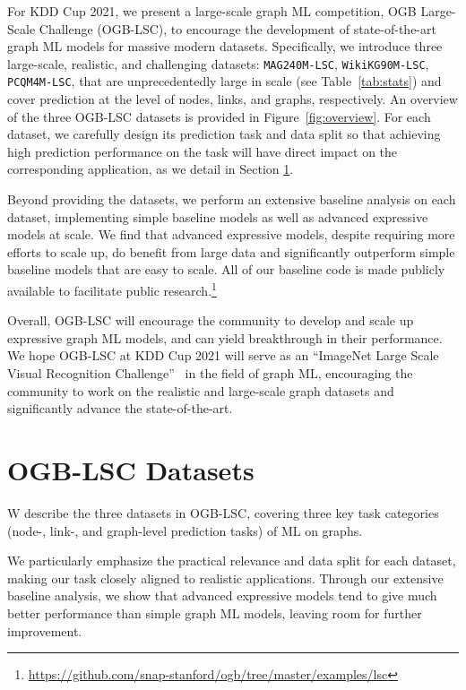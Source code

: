 \documentclass{article}
\newcommand{\challenge}{OGB Large-Scale Challenge}
\newcommand{\challengeshort}{OGB-LSC}
\newcommand{\ag}{\texttt{MAG240M-LSC}}
\newcommand{\wiki}{\texttt{WikiKG90M-LSC}}
\newcommand{\mol}{\texttt{PCQM4M-LSC}}
\begin{document}
For KDD Cup 2021, we present a large-scale graph ML competition, \challenge{} (\challengeshort{}), to encourage the development of state-of-the-art graph ML models for massive modern datasets. 
Specifically, we introduce three large-scale, realistic, and challenging datasets: \ag{}, \wiki{}, \mol{}, that are unprecedentedly large in scale (see Table~\ref{tab:stats}) and cover prediction at the level of nodes, links, and graphs, respectively.
An overview of the three \challengeshort{} datasets is provided in Figure~\ref{fig:overview}.
For each dataset, we carefully design its prediction task and data split so that achieving high prediction performance on the task will have direct impact on the corresponding application, as we detail in Section \ref{sec:problem}.

Beyond providing the datasets, we perform an extensive baseline analysis on each dataset, implementing simple baseline models as well as advanced expressive models at scale.
We find that advanced expressive models, despite requiring more efforts to scale up, do benefit from large data and significantly outperform simple baseline models that are easy to scale.
All of our baseline code is made publicly available to facilitate public research.\footnote{\url{https://github.com/snap-stanford/ogb/tree/master/examples/lsc}} 

Overall, \challengeshort{} will encourage the community to develop and scale up expressive graph ML models, and can yield breakthrough in their performance. 
We hope \challengeshort{} at KDD Cup 2021 will serve as an ``ImageNet Large Scale Visual Recognition Challenge''~\citep{russakovsky2015imagenet} in the field of graph ML, encouraging the community to work on the realistic and large-scale graph datasets and significantly advance the state-of-the-art.

 
\section{\challengeshort{} Datasets}
\label{sec:problem}
W describe the three datasets in \challengeshort{}, covering three key task categories (node-, link-, and graph-level prediction tasks) of ML on graphs.

We particularly emphasize the practical relevance and data split for each dataset, making our task closely aligned to realistic applications. Through our extensive baseline analysis, we show that advanced expressive models tend to give much better performance than simple graph ML models, leaving room for further improvement.
\end{document}
